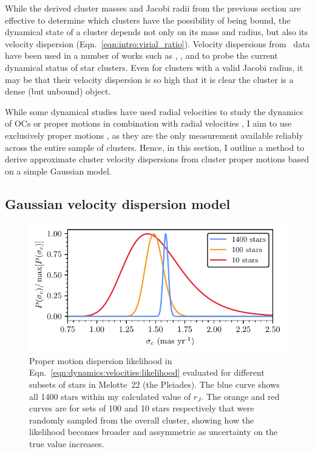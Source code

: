 While the derived cluster masses and Jacobi radii from the previous section are effective to determine which clusters have the possibility of being bound, the dynamical state of a cluster depends not only on its mass and radius, but also its velocity dispersion (Eqn.~\ref{eqn:intro:virial_ratio}). Velocity dispersions from \gaia\ data have been used in a number of works such as \cite{bravi_gaia-eso_2018}, \cite{kuhn_kinematics_2019}, and \cite{pang_3d_2021} to probe the current dynamical status of star clusters. Even for clusters with a valid Jacobi radius, it may be that their velocity dispersion is so high that it is clear the cluster is a dense (but unbound) object. 

While some dynamical studies have used radial velocities to study the dynamics of OCs \citep[e.g.][]{bravi_gaia-eso_2018} or proper motions in combination with radial velocities \citep[e.g.][]{evans_mass_2022-1}, I aim to use exclusively proper motions \citep[e.g. as in][]{kuhn_kinematics_2019}, as they are the only measurement available reliably across the entire sample of clusters. Hence, in this section, I outline a method to derive approximate cluster velocity dispersions from cluster proper motions based on a simple Gaussian model.


\subsection{Gaussian velocity dispersion model}
\label{sec:dynamics:velocities:model}

\begin{figure}[t]
    \centering
    \includegraphics[width=\textwidth]{fig/c4/dispersion_pdf.pdf}
    \caption[Proper motion dispersion likelihood in Eqn.~\ref{eqn:dynamics:velocities:likelihood} evaluated for different subsets of stars in Melotte~22]{Proper motion dispersion likelihood in Eqn.~\ref{eqn:dynamics:velocities:likelihood} evaluated for different subsets of stars in Melotte~22 (the Pleiades). The blue curve shows all 1400 stars within my calculated value of $r_J$. The orange and red curves are for sets of 100 and 10 stars respectively that were randomly sampled from the overall cluster, showing how the likelihood becomes broader and assymmetric as uncertainty on the true value increases.}
    \label{fig:dynamics:velocities:pdfs}
\end{figure}

